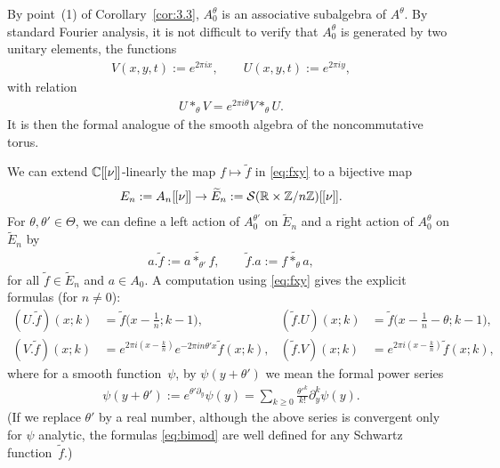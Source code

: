 \documentclass[10pt,a4paper]{amsart}
\numberwithin{equation}{section}
\theoremstyle{definition}
\newcommand{\R}{\mathbb{R}}
\newcommand{\C}{\mathbb{C}}
\newcommand{\Z}{\mathbb{Z}}
\newcommand{\mc}{\mathcal}
\newcommand{\lbrak}{[\hspace{-0.5pt}[}
\newcommand{\rbrak}{]\hspace{-0.5pt}]}
\renewcommand{\hbar}{\nu}
\begin{document}
By point~(1) of Corollary~\ref{cor:3.3}, $A_0^\theta$ is an associative subalgebra of $A^\theta$.
By standard Fourier analysis, it is not dif\/f\/icult to verify that $A^\theta_0$ is generated by two unitary elements, the functions
\begin{gather}\label{eq:VUtorus}
V(x,y,t):=e^{2\pi ix} ,\qquad
U(x,y,t):=e^{2\pi iy} ,
\end{gather}
with relation
\begin{gather}\label{eq:VstarU}
U\ast_\theta V=e^{2\pi i\theta} V\ast_\theta U .
\end{gather}
It is then the formal analogue of the smooth algebra of the noncommutative torus.

We can extend $\C\lbrak \hbar\rbrak $-linearly the map $f\mapsto\widetilde{f}$ in \eqref{eq:fxy} to a bijective map
\begin{gather*}
E_n:=A_n\lbrak\hbar\rbrak\to\widetilde{E}_n:=\mc{S}(\R\times\Z/n\Z)\lbrak\hbar\rbrak .
\end{gather*}
For $\theta,\theta'\in\Theta$,
we can def\/ine a left action of $A^{\theta'}_0$
on $\widetilde{E}_n$ and a right action of $A^\theta_0$ on $\widetilde{E}_n$ by
\begin{gather*}
a.\widetilde{f}:=\widetilde{a\ast_{\theta'}f} ,
\qquad
\widetilde{f}.a:=\widetilde{f\ast_\theta a} ,
\end{gather*}
for all $\widetilde{f}\in\widetilde{E}_n$ and $a\in A_0$.
A computation using
\eqref{eq:fxy} gives the explicit formulas (for $n\neq 0$):
\begin{subequations}\label{eq:bimod}
\begin{align}
(U.\widetilde{f})(x;k) &=\widetilde{f}\big(x-\tfrac{1}{n};k-1\big) ,&
(\widetilde{f}.U)(x;k) &=\widetilde{f}\big(x-\tfrac{1}{n}-\theta;k-1\big) , \\
(V.\widetilde{f})(x;k) &=e^{2\pi i(x-\frac{k}{n})}e^{-2\pi in\theta'x}\widetilde{f}(x;k) , &
(\widetilde{f}.V)(x;k) &=e^{2\pi i(x-\frac{k}{n})}\widetilde{f}(x;k) ,
\end{align}
\end{subequations}
where for a smooth function~$\psi$,
by $\psi(y+\theta')$ we mean the formal power series
\begin{gather*}
\psi(y+\theta'):=e^{\theta'\partial_y}\psi(y)=\sum_{k\geq 0}\tfrac{\theta'^k}{k!}\partial_y^k\psi(y) .
\end{gather*}
(If we replace $\theta'$ by a real number, although the above 	series is convergent only for $\psi$ analytic, the formulas \eqref{eq:bimod} are well def\/ined for any Schwartz function~$\widetilde{f}$.)
\end{document}
